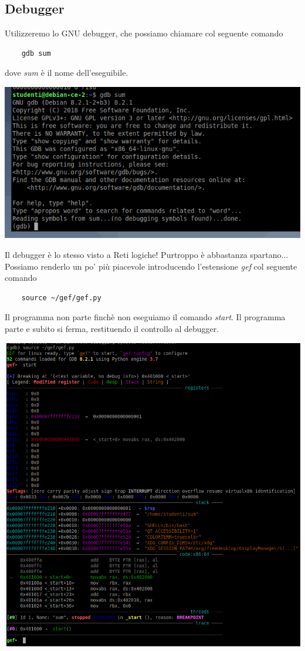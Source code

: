 \subsection{Debugger} Utilizzeremo lo GNU debugger, che possiamo chiamare col seguente comando
\begin{verbatim}
	gdb sum
\end{verbatim}
dove \emph{sum} è il nome dell'eseguibile.
\begin{center}
	\includegraphics{img/143.PNG}
\end{center}
Il debugger è lo stesso visto a Reti logiche! Purtroppo è abbastanza spartano... Possiamo renderlo un po' più piacevole introducendo l'estensione \emph{gef} col seguente comando
\begin{verbatim}
	source ~/gef/gef.py
\end{verbatim}
Il programma non parte finchè non eseguiamo il comando \emph{start}. Il programma parte e subito si ferma, restituendo il controllo al debugger.
\begin{center}
	\includegraphics[scale=.9]{img/144.PNG}
\end{center}
